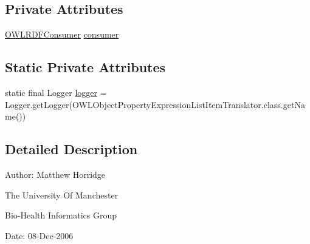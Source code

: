 \subsection*{Private Attributes}
\begin{DoxyCompactItemize}
\item 
\hyperlink{classorg_1_1coode_1_1owlapi_1_1rdfxml_1_1parser_1_1_o_w_l_r_d_f_consumer}{O\-W\-L\-R\-D\-F\-Consumer} \hyperlink{classorg_1_1coode_1_1owlapi_1_1rdfxml_1_1parser_1_1_o_w_l_object_property_expression_list_item_translator_af211e5e3c6169df55f5ed609f0222850}{consumer}
\end{DoxyCompactItemize}
\subsection*{Static Private Attributes}
\begin{DoxyCompactItemize}
\item 
static final Logger \hyperlink{classorg_1_1coode_1_1owlapi_1_1rdfxml_1_1parser_1_1_o_w_l_object_property_expression_list_item_translator_a3dc74c290af67d85fda9ef34f5920ac5}{logger} = Logger.\-get\-Logger(O\-W\-L\-Object\-Property\-Expression\-List\-Item\-Translator.\-class.\-get\-Name())
\end{DoxyCompactItemize}


\subsection{Detailed Description}
Author\-: Matthew Horridge\par
 The University Of Manchester\par
 Bio-\/\-Health Informatics Group\par
 Date\-: 08-\/\-Dec-\/2006\par
\par
 

